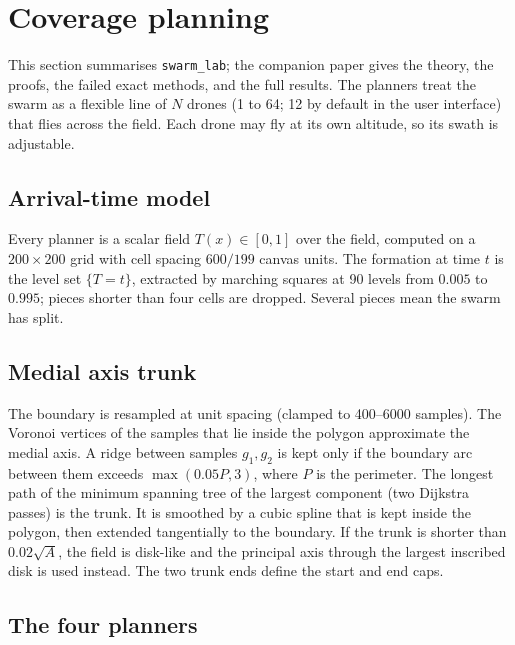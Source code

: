 \documentclass[11pt,a4paper]{article}
\newcommand{\code}[1]{\texttt{#1}}
\begin{document}
\section{Coverage planning}
\label{sec:coverage}

This section summarises \code{swarm\_lab}; the companion paper \cite{coverage} gives the theory, the proofs,
the failed exact methods, and the full results. The planners treat the swarm as a flexible line of $N$ drones
(1 to 64; 12 by default in the user interface) that flies across the field. Each drone may fly at its own
altitude, so its swath is adjustable.

\subsection{Arrival-time model}

Every planner is a scalar field $T(x)\in[0,1]$ over the field, computed on a $200\times200$ grid with cell
spacing $600/199$ canvas units. The formation at time $t$ is the level set $\{T=t\}$, extracted by marching
squares at 90 levels from $0.005$ to $0.995$; pieces shorter than four cells are dropped. Several pieces
mean the swarm has split.

\subsection{Medial axis trunk}

The boundary is resampled at unit spacing (clamped to 400--6000 samples). The Voronoi vertices of the
samples that lie inside the polygon approximate the medial axis. A ridge between samples $g_1,g_2$ is kept
only if the boundary arc between them exceeds $\max(0.05P, 3)$, where $P$ is the perimeter. The longest path
of the minimum spanning tree of the largest component (two Dijkstra passes) is the trunk. It is smoothed by
a cubic spline that is kept inside the polygon, then extended tangentially to the boundary. If the trunk is
shorter than $0.02\sqrt{A}$, the field is disk-like and the principal axis through the largest inscribed
disk is used instead. The two trunk ends define the start and end caps.

\subsection{The four planners}
\end{document}
